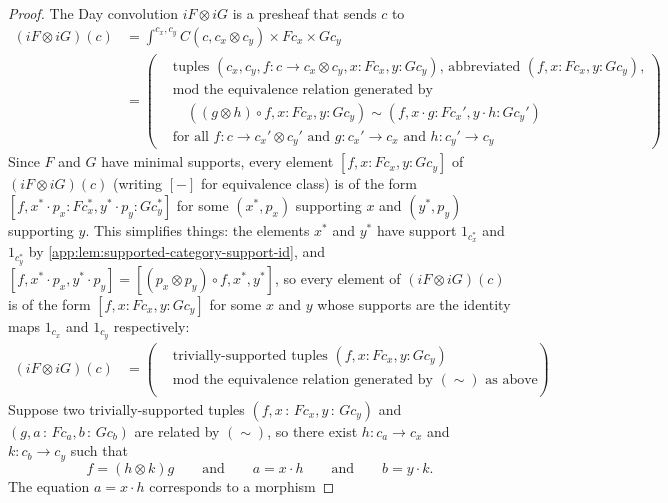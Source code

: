 \documentclass[
  sigconf,
  screen, ]{acmart}
\theoremstyle{definition}
\newcommand\ofty{\,{:}\,}
\begin{document}
\begin{proof}
  The Day convolution $iF\otimes iG$ is a presheaf that sends $ c$ to
  \begin{align*}
    (iF\otimes iG)( c)
    &= \int^{ c_x,  c_y}
    C( c, c_x\otimes  c_y) \times
    F c_x \times G c_y \\
    &= \left(\begin{aligned}
      &\text{tuples $( c_x, c_y, f :  c\to c_x\otimes  c_y, x : F c_x, y : G c_y)$, abbreviated $(f,x:F c_x,y:G c_y)$,} \\
      &\text{mod the equivalence relation generated by} \\
      &\quad ((g\otimes h)\circ f,x:F c_x,y:G c_y)\sim(f,x\cdot g:F c_x',y\cdot h:G c_y') \\
      &\text{for all $f :  c\to c_x'\otimes  c_y'$ and $g :  c_x'\to c_x$ and $h :  c_y'\to c_y$}
    \end{aligned}\right)
  \end{align*}
  Since $F$ and $G$ have minimal supports,
  every element $[f,x:F c_x,y:G c_y]$
  of $(iF\otimes iG)( c)$
  (writing $[-]$ for equivalence class)
  is of the form $[f,x^*\cdot p_x:F c_x^*, y^* \cdot p_y : G c_y^*]$
  for some $(x^*, p_x)$ supporting $x$ and $(y^*, p_y)$ supporting $y$.
  This simplifies things:
  the elements $x^*$ and $y^*$ have support $1_{ c_x^*}$ and $1_{ c_y^*}$
  by \cref{app:lem:supported-category-support-id},
  and $[f,x^*\cdot p_x, y^*\cdot p_y] = [(p_x\otimes p_y)\circ f, x^*,y^*]$,
  so every element of $(iF\otimes iG)( c)$
  is of the form $[f, x : F c_x, y : G c_y]$
  for some $x$ and $y$ whose supports are the identity maps $1_{ c_x}$
  and $1_{ c_y}$ respectively:
  \begin{align*}
    (iF\otimes iG)( c) &= \left(\begin{aligned}
      &\text{trivially-supported tuples $(f, x : F c_x, y : G c_y)$} \\
      &\text{mod the equivalence relation generated by $(\sim)$ as above} \\
    \end{aligned}\right)
  \end{align*}
  Suppose two trivially-supported tuples $(f,x\ofty F c_x,y\ofty G c_y)$
  and $(g,a\ofty F c_a,b\ofty G c_b)$ are
  related by $(\sim)$,
  so there exist $h :  c_a\to  c_x$ and $k :  c_b\to c_y$ such that
  \[ 
    f = (h\otimes k)  g
    \qquad\text{and}\qquad
    a = x\cdot h
    \qquad\text{and}\qquad
    b = y\cdot k.
    \]
  The equation $a = x\cdot h$ corresponds to a
  morphism

\end{proof}
\end{document}
